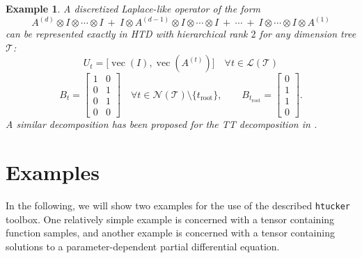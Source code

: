 \documentclass[11pt, a4paper]{article}
\newcommand{\calL}{\mathcal{L}}
\newcommand{\calN}{\mathcal{N}}
\newcommand{\calT}{\mathcal{T}}
\newcommand{\htucker}{{\tt htucker}}
\newtheorem{example}[theorem]{\bf Example}
\DeclareMathOperator{\vect}{vec}
\begin{document}
\begin{example} \label{example:laplace}
A discretized Laplace-like operator of the form
\begin{equation} \label{eq:lapl}
A^{(d)} \otimes I \otimes \cdots \otimes I 
\  + \   I \otimes A^{(d-1)} \otimes I \otimes \cdots \otimes I 
\  + \  \cdots
\  + \  I \otimes \cdots \otimes I \otimes A^{(1)}
\end{equation}
can be represented exactly in HTD with hierarchical rank $2$ for any dimension tree $\calT$:
\[
U_t = \big[ \vect(I), \vect(A^{(t)}) \big] \quad \forall t \in \calL(\calT)
\]
\[B_t = \left[ \begin{array}{cc}
1 & 0 \\ 0 & 1 \\ 0 & 1 \\ 0 & 0
\end{array} \right] \quad \forall t \in \calN(\calT) \setminus \{t_{\text{root}}\},\qquad 
 B_{t_{\text{root}}} =
\left[ \begin{array}{c}
0 \\ 1 \\ 1 \\ 0
\end{array} \right].
\]
A similar decomposition has been proposed for the TT decomposition in \cite{KazK10}.
\end{example}

\section{Examples} \label{sec:examples}

In the following, we will show two examples for the use of the 
described \htucker{} toolbox. One relatively simple example is concerned with a
tensor containing function samples, and another example is concerned with a tensor
containing solutions to a parameter-dependent partial differential equation.
\end{document}
